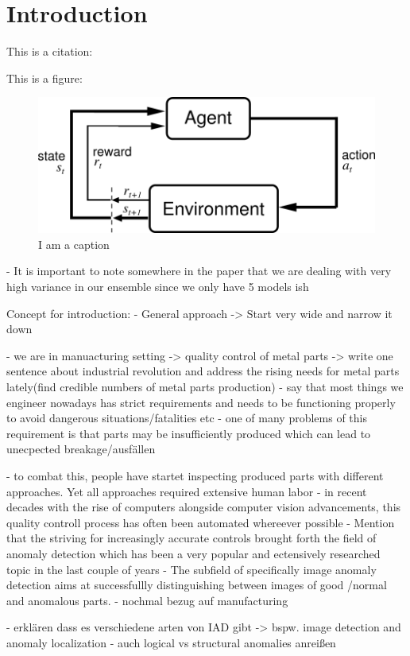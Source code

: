 \chapter{Introduction}
\label{chap:introduction}
This is a citation: \cite{patchCore2022}


This is a figure: 

\begin{figure}[ht]
    \centering
    \includegraphics[width=.5\textwidth]{figures/AgentEnviornment.png}
    \caption{I am a caption}
    \label{fig:my_label}
\end{figure}



- It is important to note somewhere in the paper that we are dealing with very high variance in our ensemble since we only have 5 models ish

Concept for introduction:
- General approach -> Start very wide and narrow it down

- we are in manuacturing setting -> quality control of metal parts
-> write one sentence about industrial revolution and address the rising needs for metal parts lately(find credible numbers of metal parts production) 
- say that most things we engineer nowadays has strict requirements and needs to be functioning properly to avoid dangerous situations/fatalities etc
- one of many problems of this requirement is that parts may be insufficiently produced which can lead to unecpected breakage/ausfällen

- to combat this, people have startet inspecting produced parts with different approaches. Yet all approaches required extensive human labor
- in recent decades with the rise of computers alongside computer vision advancements, this quality controll process has often been automated 
  whereever possible
- Mention that the striving for increasingly accurate controls brought forth the field of anomaly detection which has been a very popular 
  and ectensively researched topic in the last couple of years
- The subfield of specifically image anomaly detection aims at successfullly distinguishing between images of good /normal and 
  anomalous parts.
- nochmal bezug auf manufacturing

- erklären dass es verschiedene arten von IAD gibt -> bspw. image detection and anomaly localization
- auch logical vs structural anomalies anreißen

